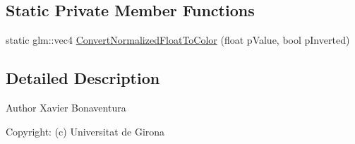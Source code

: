 \subsection*{Static Private Member Functions}
\begin{DoxyCompactItemize}
\item 
static glm\+::vec4 \hyperlink{class_tools_a2c4b1ff763df162ba0a2be81290143f6}{Convert\+Normalized\+Float\+To\+Color} (float p\+Value, bool p\+Inverted)
\end{DoxyCompactItemize}


\subsection{Detailed Description}
\begin{DoxyAuthor}{Author}
Xavier Bonaventura 

Copyright\+: (c) Universitat de Girona 
\end{DoxyAuthor}


